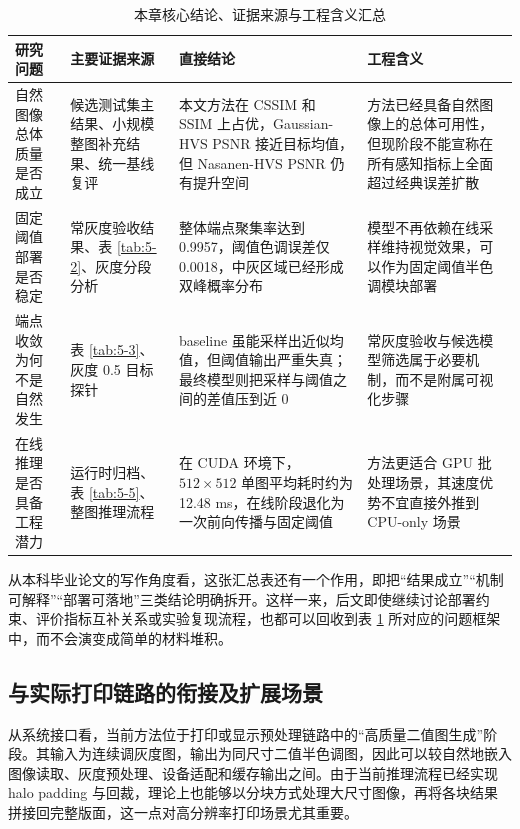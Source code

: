 \documentclass[thesis]{../zstucs-graduation-project}
\begin{document}
\begin{table}[H]
    \centering
    \small
    \caption{本章核心结论、证据来源与工程含义汇总}
    \label{tab:5-6}
    \setlength{\tabcolsep}{4pt}
    \begin{tabularx}{0.98\textwidth}{>{\raggedright\arraybackslash}p{}>{\raggedright\arraybackslash}p{}>{\raggedright\arraybackslash}p{}X}
        \toprule
        研究问题 & 主要证据来源 & 直接结论 & 工程含义 \\
        \midrule
        自然图像总体质量是否成立 & 候选测试集主结果、小规模整图补充结果、统一基线复评 & 本文方法在 CSSIM 和 SSIM 上占优，Gaussian-HVS PSNR 接近目标均值，但 Nasanen-HVS PSNR 仍有提升空间 & 方法已经具备自然图像上的总体可用性，但现阶段不能宣称在所有感知指标上全面超过经典误差扩散 \\
        固定阈值部署是否稳定 & 常灰度验收结果、表 \ref{tab:5-2}、灰度分段分析 & 整体端点聚集率达到 0.9957，阈值色调误差仅 0.0018，中灰区域已经形成双峰概率分布 & 模型不再依赖在线采样维持视觉效果，可以作为固定阈值半色调模块部署 \\
        端点收敛为何不是自然发生 & 表 \ref{tab:5-3}、灰度 0.5 目标探针 & baseline 虽能采样出近似均值，但阈值输出严重失真；最终模型则把采样与阈值之间的差值压到近 0 & 常灰度验收与候选模型筛选属于必要机制，而不是附属可视化步骤 \\
        在线推理是否具备工程潜力 & 运行时归档、表 \ref{tab:5-5}、整图推理流程 & 在 CUDA 环境下，$512\times512$ 单图平均耗时约为 12.48 ms，在线阶段退化为一次前向传播与固定阈值 & 方法更适合 GPU 批处理场景，其速度优势不宜直接外推到 CPU-only 场景 \\
        \bottomrule
    \end{tabularx}
\end{table}

从本科毕业论文的写作角度看，这张汇总表还有一个作用，即把“结果成立”“机制可解释”“部署可落地”三类结论明确拆开。这样一来，后文即使继续讨论部署约束、评价指标互补关系或实验复现流程，也都可以回收到表 \ref{tab:5-6} 所对应的问题框架中，而不会演变成简单的材料堆积。

\subsection{与实际打印链路的衔接及扩展场景}
从系统接口看，当前方法位于打印或显示预处理链路中的“高质量二值图生成”阶段。其输入为连续调灰度图，输出为同尺寸二值半色调图，因此可以较自然地嵌入图像读取、灰度预处理、设备适配和缓存输出之间。由于当前推理流程已经实现 halo padding 与回裁，理论上也能够以分块方式处理大尺寸图像，再将各块结果拼接回完整版面，这一点对高分辨率打印场景尤其重要。
\end{document}
